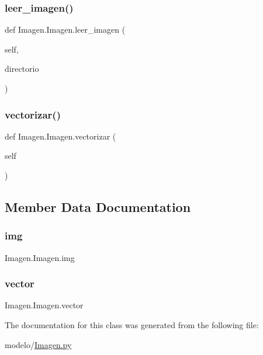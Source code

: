 \mbox{\label{class_imagen_1_1_imagen_a76c63b1c129f5ef3e7ea63802209e645}} 
\subsubsection{\texorpdfstring{leer\+\_\+imagen()}{leer\_imagen()}}
{\footnotesize\ttfamily def Imagen.\+Imagen.\+leer\+\_\+imagen (\begin{DoxyParamCaption}\item[{}]{self,  }\item[{}]{directorio }\end{DoxyParamCaption})}

\mbox{\label{class_imagen_1_1_imagen_a4cdb42ba6cf651b032e66111f2a28219}} 
\subsubsection{\texorpdfstring{vectorizar()}{vectorizar()}}
{\footnotesize\ttfamily def Imagen.\+Imagen.\+vectorizar (\begin{DoxyParamCaption}\item[{}]{self }\end{DoxyParamCaption})}



\subsection{Member Data Documentation}
\mbox{\label{class_imagen_1_1_imagen_ae3a41e1a6fae0affa3b4735c50212093}} 
\subsubsection{\texorpdfstring{img}{img}}
{\footnotesize\ttfamily Imagen.\+Imagen.\+img}

\mbox{\label{class_imagen_1_1_imagen_ad7ff22a9f89ed827ec52d0ccd8934141}} 
\subsubsection{\texorpdfstring{vector}{vector}}
{\footnotesize\ttfamily Imagen.\+Imagen.\+vector}



The documentation for this class was generated from the following file\+:\begin{DoxyCompactItemize}
\item 
modelo/\mbox{\hyperlink{_imagen_8py}{Imagen.\+py}}\end{DoxyCompactItemize}
